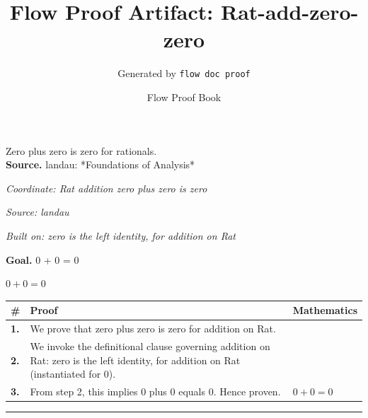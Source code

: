 \documentclass[11pt]{article}
\title{Flow Proof Artifact: Rat-add-zero-zero}
\author{Generated by \texttt{flow doc proof}}
\date{Flow Proof Book}
\theoremstyle{definition}
\begin{document}
\maketitle
Zero plus zero is zero for rationals.\\[0.5em]
\textbf{Source.} landau: *Foundations of Analysis*\\[0.5em]
\bigskip
{}\par
\smallskip\noindent\textit{Coordinate: Rat \cdot addition \cdot zero plus zero is zero}\par
\smallskip\noindent\textit{Source: landau}\par
\smallskip\noindent\textit{Built on: zero is the left identity, for addition on Rat}\par
\medskip
\noindent\textbf{Goal.} 0 + 0 = 0\par
\noindent$\displaystyle 0 + 0 = 0$\par
\medskip
\noindent
\begin{tabular}{@{} >{\raggedright\arraybackslash}p{} >{\raggedright\arraybackslash}p{} >{\raggedleft\arraybackslash}p{} @{}}
\textbf{\#} & \textbf{Proof} & \textbf{Mathematics} \\
\midrule
\textbf{1.} & We prove that zero plus zero is zero for addition on Rat. & \\[0.45em]
\textbf{2.} & We invoke the definitional clause governing addition on Rat: zero is the left identity, for addition on Rat (instantiated for 0). & \\[0.45em]
\textbf{3.} & From step 2, this implies 0 plus 0 equals 0. Hence proven. & $\displaystyle 0 + 0 = 0$ \\[0.45em]
\bottomrule
\end{tabular}
\label{thm:Rat-addition-zero_plus_zero_is_zero}
\par\medskip\hrule
\end{document}
